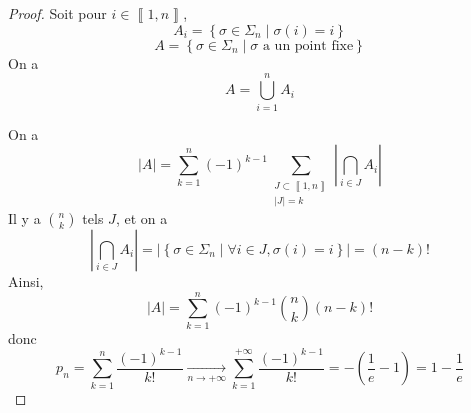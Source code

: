 \documentclass[12pt]{article}
\begin{document}
\begin{proof}
    Soit pour $i\in\left\llbracket 1,n\right\rrbracket$, 
    \begin{equation}
        A_{i}=\left\{\sigma\in\Sigma_{n}\middle|\sigma(i)=i\right\}
    \end{equation}
    \begin{equation}
        A=\left\{\sigma\in\Sigma_{n}\middle|\sigma\text{ a un point fixe}\right\}
    \end{equation}
    On a 
    \begin{equation}
        A=\bigcup_{i=1}^{n}A_{i}
    \end{equation}

    On a 
    \begin{equation}
        \left\lvert A\right\rvert=\sum_{k=1}^{n}(-1)^{k-1}\sum_{\substack{J\subset\left\llbracket 1,n\right\rrbracket\\\left\lvert J\right\rvert=k}}\left\lvert\bigcap_{i\in J}A_{i}\right\rvert
    \end{equation}
    Il y a $\binom{n}{k}$ tels $J$, et on a 
    \begin{equation}
        \left\lvert\bigcap_{i\in J}A_{i}\right\rvert=\left\lvert\left\{\sigma\in\Sigma_{n}\middle|\forall i\in J,\sigma(i)=i\right\}\right\rvert=(n-k)!
    \end{equation}
    Ainsi, 
    \begin{equation}
        \left\lvert A\right\rvert=\sum_{k=1}^{n}(-1)^{k-1}\binom{n}{k}(n-k)!
    \end{equation}
    donc 
    \begin{equation}
        \boxed{p_{n}=\sum_{k=1}^{n}\frac{(-1)^{k-1}}{k!}\xrightarrow[n\to+\infty]{}\sum_{k=1}^{+\infty}\frac{(-1)^{k-1}}{k!}=-\left(\frac{1}{e}-1\right)=1-\frac{1}{e}}
    \end{equation}
\end{proof}
\end{document}
